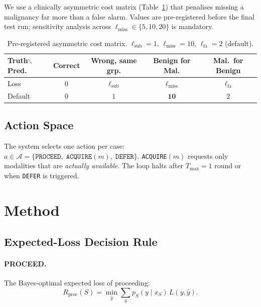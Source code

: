 \documentclass[conference]{IEEEtran}
\newcommand{\1}{\mathbf{1}}
\begin{document}
We use a clinically asymmetric cost matrix (Table~\ref{tab:cost}) that
penalises missing a malignancy far more than a false alarm. Values are
pre-registered before the final test run; sensitivity analysis across
$\ell_{\text{miss}} \in \{5,10,20\}$ is mandatory.

\begin{table}[H]
  \centering
  \caption{%
    Pre-registered asymmetric cost matrix.
    $\ell_{\text{sub}}=1$, $\ell_{\text{miss}}=10$, $\ell_{\text{fa}}=2$ (default).
  }
  \label{tab:cost}
  \renewcommand{\arraystretch}{1.2}
  \small
  \begin{tabular}{lcccc}
    \toprule
    \textbf{Truth$\backslash$Pred.}
      & \textbf{Correct}
      & \textbf{Wrong, same grp.}
      & \textbf{Benign for Mal.}
      & \textbf{Mal.\ for Benign} \\
    \midrule
    Loss & $0$ & $\ell_{\text{sub}}$ & $\ell_{\text{miss}}$ & $\ell_{\text{fa}}$ \\
    Default & $0$ & $1$ & $\mathbf{10}$ & $2$ \\
    \bottomrule
  \end{tabular}
\end{table}

\subsection{Action Space}

The system selects one action per case:
$a \in \mathcal{A} = \{\texttt{PROCEED},\;\texttt{ACQUIRE}(m),\;\texttt{DEFER}\}.$
\texttt{ACQUIRE}$(m)$ requests only modalities that are \emph{actually available}.
The loop halts after $T_{\max}=1$ round or when \texttt{DEFER} is triggered.

\section{Method}
\label{sec:method}

\subsection{Expected-Loss Decision Rule}

\paragraph{PROCEED.}
The Bayes-optimal expected loss of proceeding:
\begin{equation}
  R_{\text{proc}}(S) = \min_{\hat{y}} \sum_{y} p_S(y \mid x_S)\, L(y, \hat{y}).
  \label{eq:Rproc}
\end{equation}
\end{document}
